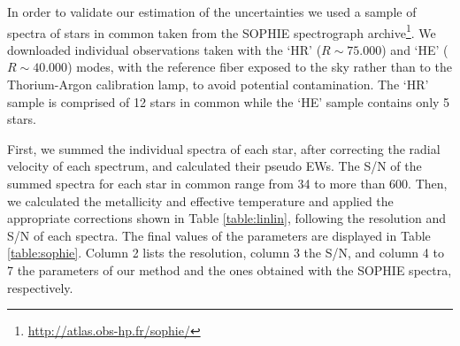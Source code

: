 \documentclass{aa}
\begin{document}
In order to validate our estimation of the uncertainties we used a sample of spectra of stars in common taken from the SOPHIE spectrograph \citep{Bouchy-2006} archive\footnote{\url{http://atlas.obs-hp.fr/sophie/}}. We downloaded individual observations taken with the `HR' ($R\sim75.000$) and `HE' ($R\sim40.000$) modes, with the reference fiber exposed to the sky rather than to the Thorium-Argon calibration lamp, to avoid potential contamination. The `HR' sample is comprised of 12 stars in common while the `HE' sample contains only 5 stars.

First, we summed the individual spectra of each star, after correcting the radial velocity of each spectrum, and calculated their pseudo EWs. The S/N of the summed spectra for each star in common range from 34 to more than 600. Then, we calculated the metallicity and effective temperature and applied the appropriate corrections shown in Table \ref{table:linlin}, following the resolution and S/N of each spectra. The final values of the parameters are displayed in Table \ref{table:sophie}. Column 2 lists the resolution, column 3 the S/N, and column 4 to 7 the parameters of our method and the ones obtained with the SOPHIE spectra, respectively. %
\end{document}

